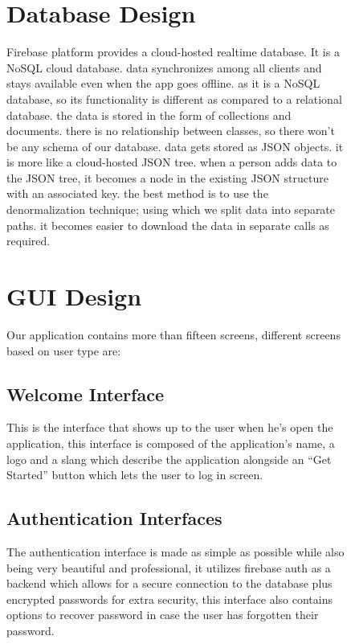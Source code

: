 \begin{figure}
\section{Database Design}
Firebase platform provides a cloud-hosted realtime database. It is a NoSQL cloud database. data synchronizes among all clients and stays available even when the app goes offline. as it is a NoSQL database, so its functionality is different as compared to a relational database. the data is stored in the form of collections and documents. there is no relationship between classes, so there won’t be any schema of our database. data gets stored as JSON objects. it is more like a cloud-hosted JSON tree. when a person adds data to the JSON tree, it becomes a node in the existing JSON structure with an associated key. the best method is to use the denormalization technique; using which we split data into separate paths. it becomes easier to download the data in separate calls as required.
\end{figure}

\begin{figure}
\section{GUI Design}
Our application contains more than fifteen screens, different screens based on user type are:
\end{figure}

\begin{figure}
\subsection{Welcome Interface}
This is the interface that shows up to the user when he’s open the application, this interface is composed of the application’s name, a logo and a slang which describe the application alongside an “Get Started” button which lets the user to log in screen.
\begin{center}
\end{center}
\subsection{Authentication Interfaces}
The authentication interface is made as simple as possible while also being very beautiful and professional, it utilizes firebase auth as a backend which allows for a secure connection to the database plus encrypted passwords for extra security, this interface also contains options to recover password in case the user has forgotten their password.

\end{figure}

